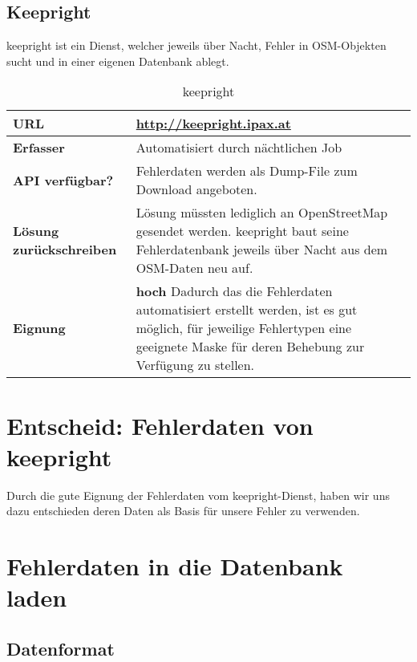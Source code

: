 \subsection{Keepright}
keepright ist ein Dienst, welcher jeweils über Nacht, Fehler in OSM-Objekten sucht und in einer eigenen Datenbank ablegt.

\begin{table}[H]
\centering
\begin{tabular}{|p{0.25\twocelltabwidth}|p{0.75\twocelltabwidth}|}
\hline 
\small{\textbf{URL}} & \url{http://keepright.ipax.at} \\
\hline 
\small{\textbf{Erfasser}} & Automatisiert durch nächtlichen Job \\
\hline 
\small{\textbf{API verfügbar?}} & Fehlerdaten werden als Dump-File zum Download angeboten. \\
\hline 
\small{\textbf{Lösung zurückschreiben}} & Lösung müssten lediglich an OpenStreetMap gesendet werden. keepright baut seine Fehlerdatenbank jeweils über Nacht aus dem OSM-Daten neu auf. \\
\hline
\small{\textbf{Eignung}} & \textbf{hoch} \linebreak Dadurch das die Fehlerdaten automatisiert erstellt werden, ist es gut möglich, für jeweilige Fehlertypen eine geeignete Maske für deren Behebung zur Verfügung zu stellen. \\
\hline
\end{tabular}
\caption{keepright}
\label{datenquellen-keepright}
\end{table}

\section{Entscheid: Fehlerdaten von keepright}
Durch die gute Eignung der Fehlerdaten vom keepright-Dienst, haben wir uns dazu entschieden deren Daten als Basis für unsere Fehler zu verwenden.

\section{Fehlerdaten in die Datenbank laden}

\subsection{Datenformat}